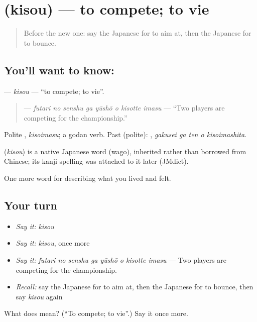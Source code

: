 \section[\texorpdfstring{\ja{きそう} (kisou)}{きそう (kisou)}]{ (kisou) — to compete; to vie}

\label{lesson:JA-C463-kisou}



\begin{quote}
Before the new one: say the Japanese for to aim at, then the Japanese for to bounce.
\end{quote}

\subsection*{You'll want to know: }
\textbf{} — \emph{kisou} — \textquotedblleft{}to compete; to vie\textquotedblright{}.

\begin{quote}
\textbf{   } — \emph{futari no senshu ga yūshō o kisotte imasu} — \textquotedblleft{}Two players are competing for the championship.\textquotedblright{}
\end{quote}

Polite \textbf{}, \emph{kisoimasu}; a godan verb. Past (polite): \textbf{  }, \emph{gakusei ga ten o kisoimashita}.

\begin{cousinweb}
\textbf{} (\emph{kisou}) is a native Japanese word (wago), inherited rather than borrowed from Chinese; its kanji spelling was attached to it later (JMdict).
\end{cousinweb}

\begin{grammarlens}[title={What you've built}]
One more word for describing what you lived and felt.
\end{grammarlens}

\subsection*{Your turn}
\begin{itemize}
\raggedright
  \item \emph{Say it:} \emph{kisou}
  \item \emph{Say it:} \emph{kisou}, once more
  \item \emph{Say it:} \emph{futari no senshu ga yūshō o kisotte imasu} — Two players are competing for the championship.
  \item \emph{Recall:} say the Japanese for to aim at, then the Japanese for to bounce, then say \emph{kisou} again
\end{itemize}

\begin{tcolorbox}[breakable,colback=teal!4,colframe=teal!35!black,title={Before you move on}]
What does  mean? (\textquotedblleft{}To compete; to vie\textquotedblright{}.) Say it once more.
\end{tcolorbox}
